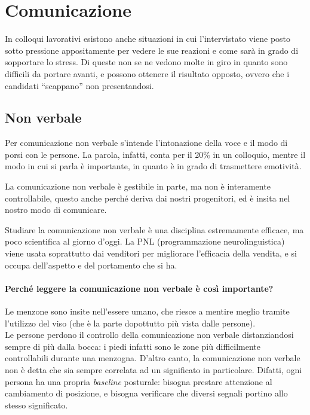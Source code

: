 \section{Comunicazione}
In colloqui lavorativi esistono anche situazioni in cui l'intervistato viene
posto sotto pressione appositamente per vedere le sue reazioni e come sarà in
grado di sopportare lo stress. Di queste non se ne vedono molte in giro in
quanto sono difficili da portare avanti, e possono ottenere il risultato
opposto, ovvero che i candidati ``scappano'' non presentandosi.

\subsection{Non verbale}

Per comunicazione non verbale s'intende l'intonazione della voce e il modo di
porsi con le persone. La parola, infatti, conta per il 20\% in un colloquio,
mentre il modo in cui si parla è importante, in quanto è in grado di
trasmettere emotività.

La comunicazione non verbale è gestibile in parte, ma non è interamente
controllabile, questo anche perché deriva dai nostri progenitori, ed è insita
nel nostro modo di comunicare.

Studiare la comunicazione non verbale è una disciplina estremamente efficace,
ma poco scientifica al giorno d'oggi. La PNL (programmazione neurolinguistica)
viene usata soprattutto dai venditori per migliorare l'efficacia della vendita,
e si occupa dell'aspetto e del portamento che si ha.

\paragraph*{Perché leggere la comunicazione non verbale è così importante?} Le
menzone sono insite nell'essere umano, che riesce a mentire meglio tramite
l'utilizzo del viso (che è la parte dopottutto più vista dalle
persone).\\[0.3cm]

\noindent Le persone perdono il controllo della comunicazione non verbale
distanziandosi sempre di più dalla bocca: i piedi infatti sono le zone più
difficilmente controllabili durante una menzogna. D'altro canto, la
comunicazione non verbale non è detta che sia sempre correlata ad un significato
in particolare. Difatti, ogni persona ha una propria \textit{baseline}
posturale: bisogna prestare attenzione al cambiamento di posizione, e bisogna
verificare che diversi segnali portino allo stesso significato.

